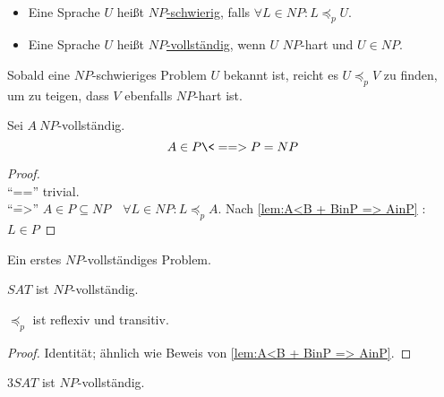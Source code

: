 
\begin{Def}[name={[$NP$-schwer und $NP$-vollständig]}]\
	\begin{itemize}
	\item Eine Sprache $U$ heißt \underline{$NP$-schwierig}, falls $\forall L\in NP : L\preceq_p U$.
	\item Eine Sprache $U$ heißt \underline{$NP$-vollständig}, wenn $U$ $NP$-hart und $U\in NP$. \qedhere
	\end{itemize}
\end{Def}
\begin{Bem}
	Sobald eine $NP$-schwieriges Problem $U$ bekannt ist, reicht es $U\preceq_p V$ zu finden, um zu teigen, dass $V$ ebenfalls $NP$-hart ist.
\end{Bem}
\begin{Satz}
	Sei $A\ NP$-vollständig.
	\[ A\in P \<==> P=NP \]
\end{Satz}
\begin{proof}\ \\
	"`\<=="' trivial.\\
	"`\==>"' $A\in P\subseteq NP\quad \forall L\in NP: L\preceq_p A$. Nach \autoref{lem:A<B + BinP => AinP} : $L\in P$
\end{proof}
Ein erstes $NP$-vollständiges Problem.

\begin{Satz}[Cook]
	$SAT$ ist $NP$-vollständig.
\end{Satz}

\begin{lemma}[name={[$\preceq_p$ ist reflexiv und transitiv]}]
	$\preceq_p$ ist reflexiv und transitiv.
\end{lemma}
\begin{proof}
	Identität; ähnlich wie Beweis von \autoref{lem:A<B + BinP => AinP}.
\end{proof}

\begin{Satz}[name={[$3SAT$ ist $NP$-vollständig]}]
	$3SAT$ ist $NP$-vollständig.
\end{Satz}


